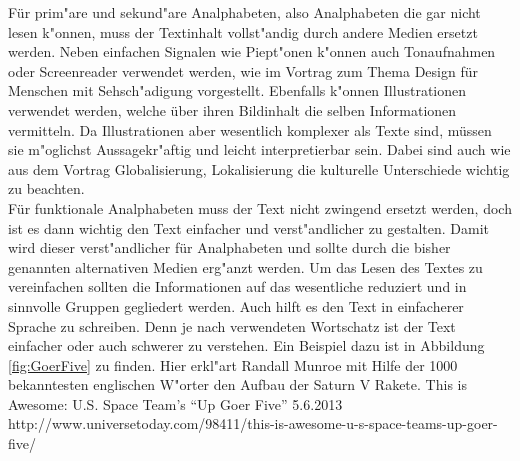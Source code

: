 Für prim"are und sekund"are Analphabeten, also Analphabeten die gar nicht lesen k"onnen, muss der Textinhalt vollst"andig durch andere Medien ersetzt werden. Neben einfachen Signalen wie Piept"onen k"onnen auch Tonaufnahmen oder Screenreader verwendet werden, wie im Vortrag zum Thema  \glqq Design für Menschen mit Sehsch"adigung\grqq{} vorgestellt.
Ebenfalls k"onnen Illustrationen verwendet werden, welche über ihren Bildinhalt die selben Informationen vermitteln.
Da Illustrationen aber wesentlich komplexer als Texte sind, müssen sie m"oglichst Aussagekr"aftig und leicht interpretierbar sein. Dabei sind auch wie aus dem Vortrag \glqq Globalisierung, Lokalisierung\grqq{} die kulturelle Unterschiede wichtig zu beachten.\\
Für funktionale Analphabeten muss der Text nicht zwingend ersetzt werden, doch ist es dann wichtig den Text einfacher und verst"andlicher zu gestalten. Damit wird dieser verst"andlicher für Analphabeten und sollte durch die bisher genannten alternativen Medien erg"anzt werden. Um das Lesen des Textes zu vereinfachen sollten die Informationen auf das wesentliche reduziert und in sinnvolle Gruppen gegliedert werden. Auch hilft es den Text in einfacherer Sprache zu schreiben. Denn je nach verwendeten Wortschatz ist der Text einfacher oder auch schwerer zu verstehen. Ein Beispiel dazu ist in Abbildung \ref{fig:GoerFive} zu finden. Hier erkl"art Randall Munroe mit Hilfe der 1000 bekanntesten englischen W"orter den Aufbau der Saturn V Rakete.
				{This is Awesome: U.S. Space Team’s “Up Goer Five”}
				{5.6.2013}
				{http://www.universetoday.com/98411/this-is-awesome-u-s-space-teams-up-goer-five/}

